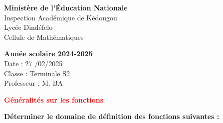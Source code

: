 \documentclass[12pt]{article}
\begin{document}
\noindent
\begin{minipage}[t]{0.48\textwidth}
\raggedright
\textbf{Ministère de l'Éducation Nationale}\\
Inspection Académique de Kédougou\\
Lycée Dindéfelo\\
Cellule de Mathématiques
\end{minipage}
\hfill
\begin{minipage}[t]{0.48\textwidth}
\raggedleft
\textbf{Année scolaire 2024-2025}\\
Date : 27	/02/2025\\
Classe : Terminale S2\\
Professeur : M. BA
\end{minipage}
\vspace{1cm}
\begin{center}
\textbf{\textcolor{red}{Généralités sur les fonctions}}
\end{center}
\vspace{1cm}

 \quad \textbf{Déterminer le domaine de définition des fonctions suivantes :}

\bigskip
\end{document}
